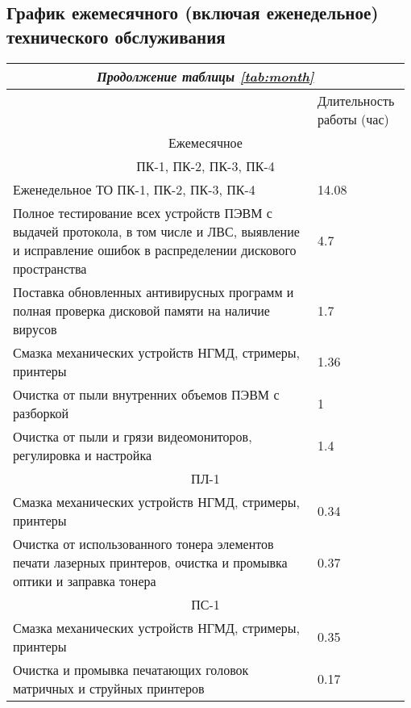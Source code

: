 \documentclass[a4paper,14pt]{extarticle}
\begin{document}
\subsection*{График ежемесячного (включая еженедельное) технического обслуживания}
	\begin{longtable}{|p{0.75\linewidth}|m{0.23\linewidth}|}
		
	
		\endfirsthead
		
		\multicolumn{2}{c}{\textit{Продолжение таблицы \ref{tab:month}}}\\
		\endhead
		
		\hline
		\endfoot
		
		
		\endlastfoot
		
		
		\hline
		\multicolumn{1}{|c|}{Наименование работы} & Длительность работы (час) \\ \hline
		\multicolumn{ 2}{|c|}{Ежемесячное} \\ \hline
		\multicolumn{ 2}{|c|}{ПК-1, ПК-2, ПК-3, ПК-4} \\ \hline
		\multicolumn{1}{|l|}{Еженедельное ТО ПК-1, ПК-2, ПК-3, ПК-4} & 14.08 \\ \hline
		Полное тестирование всех устройств ПЭВМ с выдачей протокола, в том числе и ЛВС, выявление и исправление ошибок в распределении дискового пространства  & 4.7 \\ \hline
		Поставка обновленных антивирусных программ и полная проверка дисковой памяти на наличие вирусов  & 1.7 \\ \hline
		Смазка механических устройств НГМД, стримеры, принтеры  & 1.36 \\ \hline
		Очистка от пыли внутренних объемов ПЭВМ с разборкой  & 1 \\ \hline
		Очистка от пыли и грязи видеомониторов, регулировка и настройка  & 1.4 \\ \hline
		\multicolumn{ 2}{|c|}{ПЛ-1} \\ \hline
		Смазка механических устройств НГМД, стримеры, принтеры  & 0.34 \\ \hline
		Очистка от использованного тонера элементов печати лазерных принтеров, очистка и промывка оптики и заправка тонера  & 0.37 \\ \hline
		\multicolumn{ 2}{|c|}{ПС-1} \\ \hline
		Смазка механических устройств НГМД, стримеры, принтеры  & 0.35 \\ \hline
		Очистка и промывка печатающих головок матричных и струйных принтеров  & 0.17 \\ \hline

\end{longtable}
\end{document}
